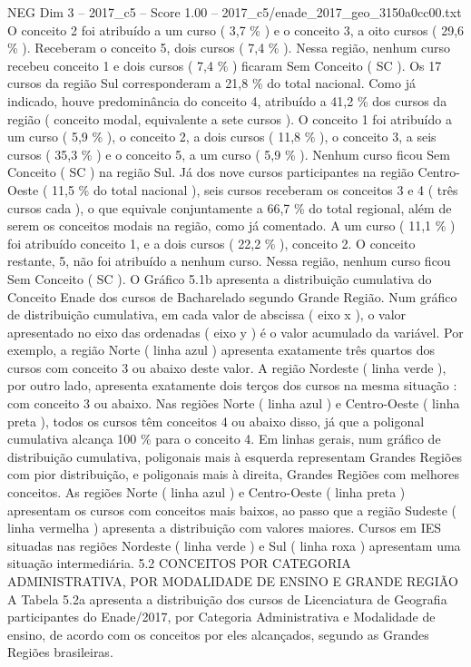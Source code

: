 \begin{textsample}{NEG Dim 3 – 2017\_c5 – Score 1.00 – 2017\_c5/enade\_2017\_geo\_3150a0cc00.txt}
O conceito 2 foi atribuído a um curso ( 3,7 \% ) e o conceito 3, a oito cursos ( 29,6 \% ).
Receberam o conceito 5, dois cursos ( 7,4 \% ).
Nessa região, nenhum curso recebeu conceito 1 e dois cursos ( 7,4 \% ) ficaram Sem Conceito ( SC ).
Os 17 cursos da região Sul corresponderam a 21,8 \% do total nacional.
Como já indicado, houve predominância do conceito 4, atribuído a 41,2 \% dos cursos da região ( conceito modal, equivalente a sete cursos ).
O conceito 1 foi atribuído a um curso ( 5,9 \% ), o conceito 2, a dois cursos ( 11,8 \% ), o conceito 3, a seis cursos ( 35,3 \% ) e o conceito 5, a um curso ( 5,9 \% ).
Nenhum curso ficou Sem Conceito ( SC ) na região Sul.
Já dos nove cursos participantes na região Centro-Oeste ( 11,5 \% do total nacional ), seis cursos receberam os conceitos 3 e 4 ( três cursos cada ), o que equivale conjuntamente a 66,7 \% do total regional, além de serem os conceitos modais na região, como já comentado.
A um curso ( 11,1 \% ) foi atribuído conceito 1, e a dois cursos ( 22,2 \% ), conceito 2.
O conceito restante, 5, não foi atribuído a nenhum curso.
Nessa região, nenhum curso ficou Sem Conceito ( SC ).
O Gráfico 5.1b apresenta a distribuição cumulativa do Conceito Enade dos cursos de Bacharelado segundo Grande Região.
Num gráfico de distribuição cumulativa, em cada valor de abscissa ( eixo x ), o valor apresentado no eixo das ordenadas ( eixo y ) é o valor acumulado da variável.
Por exemplo, a região Norte ( linha azul ) apresenta exatamente três quartos dos cursos com conceito 3 ou abaixo deste valor.
A região Nordeste ( linha verde ), por outro lado, apresenta exatamente dois terços dos cursos na mesma situação : com conceito 3 ou abaixo.
Nas regiões Norte ( linha azul ) e Centro-Oeste ( linha preta ), todos os cursos têm conceitos 4 ou abaixo disso, já que a poligonal cumulativa alcança 100 \% para o conceito 4.
Em linhas gerais, num gráfico de distribuição cumulativa, poligonais mais à esquerda representam Grandes Regiões com pior distribuição, e poligonais mais à direita, Grandes Regiões com melhores conceitos.
As regiões Norte ( linha azul ) e Centro-Oeste ( linha preta ) apresentam os cursos com conceitos mais baixos, ao passo que a região Sudeste ( linha vermelha ) apresenta a distribuição com valores maiores.
Cursos em IES situadas nas regiões Nordeste ( linha verde ) e Sul ( linha roxa ) apresentam uma situação intermediária. 5.2 CONCEITOS POR CATEGORIA ADMINISTRATIVA, POR MODALIDADE DE ENSINO E GRANDE REGIÃO A Tabela 5.2a apresenta a distribuição dos cursos de Licenciatura de Geografia participantes do Enade/2017, por Categoria Administrativa e Modalidade de ensino, de acordo com os conceitos por eles alcançados, segundo as Grandes Regiões brasileiras.

\end{textsample}
